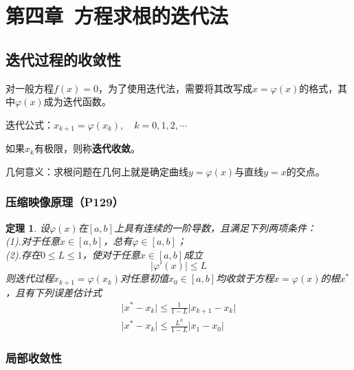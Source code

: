\documentclass[fontset=ubuntu]{ctexart}
\newtheorem{theorem}{定理}
\numberwithin{equation}{section}
\numberwithin{theorem}{section}
\begin{document}

\section{第四章\ 方程求根的迭代法}

\begin{multicols}{2}
    \subsection{迭代过程的收敛性}

    对一般方程$f(x)=0$，为了使用迭代法，需要将其改写成$x=\varphi(x)$的格式，其中$\varphi(x)$成为迭代函数。

    迭代公式：$x_{k+1}=\varphi(x_k),\quad k=0,1,2,\cdots$

    如果$x_k$有极限，则称\textbf{迭代收敛}。

    几何意义：求根问题在几何上就是确定曲线$y=\varphi(x)$与直线$y=x$的交点。

    \subsubsection{压缩映像原理（P129）}

    \begin{theorem}
        设$\varphi(x)$在$[a,b]$上具有连续的一阶导数，且满足下列两项条件：\\
        (1).对于任意$x\in[a,b]$，总有$\varphi\in[a,b]$；\\
        (2).存在$0\leq L\leq 1$，使对于任意$x\in[a,b]$成立\\
        \begin{equation}
            \lvert\varphi'(x)\rvert \leq L
        \end{equation}
        则迭代过程$x_{k+1}=\varphi(x_k)$对任意初值$x_0\in[a,b]$均收敛于方程$x=\varphi(x)$的根$x^*$，且有下列误差估计式\\
        \begin{gather}
            \lvert x^*-x_k\rvert\leq \frac{1}{1-L}\lvert x_{k+1}-x_k\rvert \\
            \lvert x^*-x_k\rvert\leq\frac{L^k}{1-L}\lvert x_1-x_0\rvert
        \end{gather}
    \end{theorem}

    \subsubsection{局部收敛性}


\end{multicols}
\end{document}
